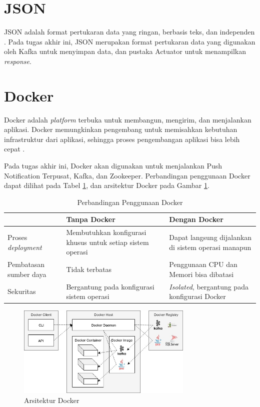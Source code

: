 \section{JSON}
\par JSON adalah format pertukaran data yang ringan, berbasis teks, dan independen \cite{json-online}. Pada tugas akhir ini, JSON merupakan format pertukaran data yang digunakan oleh Kafka untuk menyimpan data, dan pustaka Actuator untuk menampilkan \textit{response}.

\section{Docker}
\par Docker adalah \textit{platform} terbuka untuk membangun, mengirim, dan menjalankan aplikasi. Docker memungkinkan pengembang untuk memisahkan kebutuhan infrastruktur dari aplikasi, sehingga proses pengembangan aplikasi bisa lebih cepat \cite{docker-online}.
\par Pada tugas akhir ini, Docker akan digunakan untuk menjalankan Push Notification Terpusat, Kafka, dan Zookeeper. Perbandingan penggunaan Docker dapat dilihat pada Tabel \ref{t:perbandingan_docker}, dan arsitektur Docker pada Gambar \ref{img:arsitektur-docker}.
\begin{longtable}{|p{2.5cm}|p{3.5cm}|p{3.5cm}|}
	\caption{Perbandingan Penggunaan Docker} \label{t:perbandingan_docker} \\ \hline
	\rowcolor{lightgray} & Tanpa Docker & Dengan Docker \\ \hline
	Proses \textit{deployment} & Membutuhkan konfigurasi khusus untuk setiap sistem operasi & Dapat langsung dijalankan di sistem operasi manapun \\ \hline
	Pembatasan sumber daya & Tidak terbatas & Penggunaan CPU dan Memori bisa dibatasi \\ \hline
	Sekuritas & Bergantung pada konfigurasi sistem operasi & \textit{Isolated}, bergantung pada konfigurasi Docker \\ \hline
\end{longtable}
\begin{figure}[H]
\centering\includegraphics[width=0.75\textwidth]{bab2/img/arsitektur-docker.jpg}
\caption{Arsitektur Docker}
\label{img:arsitektur-docker}
\end{figure}

